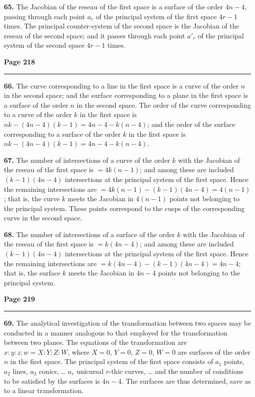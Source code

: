 \documentclass[12pt,a4paper]{article}
\theoremstyle{plain}
\theoremstyle{definition}
\theoremstyle{remark}
\begin{document}
\textbf{65.} The Jacobian of the reseau of the first space is a surface of the order $4n - 4$, passing through each point $a_r$ of the principal system of the first space $4r - 1$ times. The principal counter-system of the second space is the Jacobian of the reseau of the second space; and it passes through each point $a'_r$ of the principal system of the second space $4r - 1$ times.

\newpage
\noindent\textbf{Page 218}\\
\noindent\rule{\textwidth}{0.4pt}

\smallskip

\noindent\textbf{66.} The curve corresponding to a line in the first space is a curve of the order $n$ in the second space; and the surface corresponding to a plane in the first space is a surface of the order $n$ in the second space. The order of the curve corresponding to a curve of the order $k$ in the first space is $nk - (4n - 4)(k - 1) = 4n - 4 - k(n - 4)$; and the order of the surface corresponding to a surface of the order $k$ in the first space is $nk - (4n - 4)(k - 1) = 4n - 4 - k(n - 4)$.

\textbf{67.} The number of intersections of a curve of the order $k$ with the Jacobian of the reseau of the first space is $= 4k(n - 1)$; and among these are included $(k - 1)(4n - 4)$ intersections at the principal system of the first space. Hence the remaining intersections are $= 4k(n - 1) - (k - 1)(4n - 4) = 4(n - 1)$; that is, the curve $k$ meets the Jacobian in $4(n - 1)$ points not belonging to the principal system. These points correspond to the cusps of the corresponding curve in the second space.

\textbf{68.} The number of intersections of a surface of the order $k$ with the Jacobian of the reseau of the first space is $= k(4n - 4)$; and among these are included $(k - 1)(4n - 4)$ intersections at the principal system of the first space. Hence the remaining intersections are $= k(4n - 4) - (k - 1)(4n - 4) = 4n - 4$; that is, the surface $k$ meets the Jacobian in $4n - 4$ points not belonging to the principal system.

\newpage
\noindent\textbf{Page 219}\\
\noindent\rule{\textwidth}{0.4pt}

\smallskip

\noindent\textbf{69.} The analytical investigation of the transformation between two spaces may be conducted in a manner analogous to that employed for the transformation between two planes. The equations of the transformation are $x : y : z : w = X : Y : Z : W$, where $X = 0$, $Y = 0$, $Z = 0$, $W = 0$ are surfaces of the order $n$ in the first space. The principal system of the first space consists of $a_1$ points, $a_2$ lines, $a_3$ conics, \ldots{} $a_r$ unicursal $r$-thic curves, \ldots{} and the number of conditions to be satisfied by the surfaces is $4n - 4$. The surfaces are thus determined, save as to a linear transformation.
\end{document}
